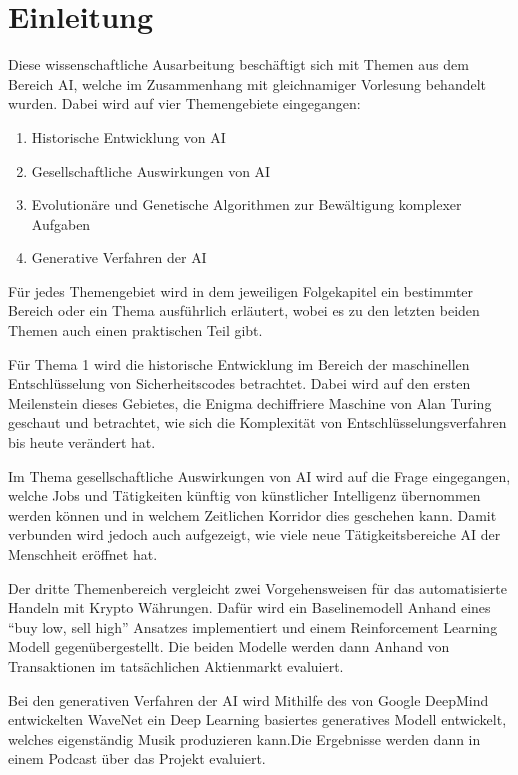 \chapter{Einleitung}

\nocite{*}

Diese wissenschaftliche Ausarbeitung beschäftigt sich mit Themen aus dem Bereich \ac{AI}, welche im Zusammenhang mit gleichnamiger Vorlesung behandelt wurden. Dabei wird auf vier Themengebiete eingegangen:

\begin{enumerate}
	\item Historische Entwicklung von \ac{AI}
	\item Gesellschaftliche Auswirkungen von \ac{AI}
	\item Evolutionäre und Genetische Algorithmen zur Bewältigung komplexer Aufgaben
	\item Generative Verfahren der \ac{AI}
\end{enumerate}

Für jedes Themengebiet wird in dem jeweiligen Folgekapitel ein bestimmter Bereich oder ein Thema ausführlich erläutert, wobei es zu den letzten beiden Themen auch einen praktischen Teil gibt.

Für Thema 1 wird die historische Entwicklung im Bereich der maschinellen Entschlüsselung von Sicherheitscodes betrachtet. Dabei wird auf den ersten Meilenstein dieses Gebietes, die Enigma dechiffriere Maschine von Alan Turing geschaut und betrachtet, wie sich die Komplexität von Entschlüsselungsverfahren bis heute verändert hat.

Im Thema gesellschaftliche Auswirkungen von \ac{AI} wird auf die Frage eingegangen, welche Jobs und Tätigkeiten künftig von künstlicher Intelligenz übernommen werden können und in welchem Zeitlichen Korridor dies geschehen kann. Damit verbunden wird jedoch auch aufgezeigt, wie viele neue Tätigkeitsbereiche \ac{AI} der Menschheit eröffnet hat.

Der dritte Themenbereich vergleicht zwei Vorgehensweisen für das automatisierte Handeln mit Krypto Währungen. Dafür wird ein Baselinemodell Anhand eines \enquote{buy low, sell high} Ansatzes implementiert und einem Reinforcement Learning Modell gegenübergestellt. Die beiden Modelle werden dann Anhand von Transaktionen im tatsächlichen Aktienmarkt evaluiert.

Bei den generativen Verfahren der \ac{AI} wird Mithilfe des von Google DeepMind entwickelten WaveNet ein Deep Learning basiertes generatives Modell entwickelt, welches eigenständig Musik produzieren kann.Die Ergebnisse werden dann in einem Podcast über das Projekt evaluiert.

